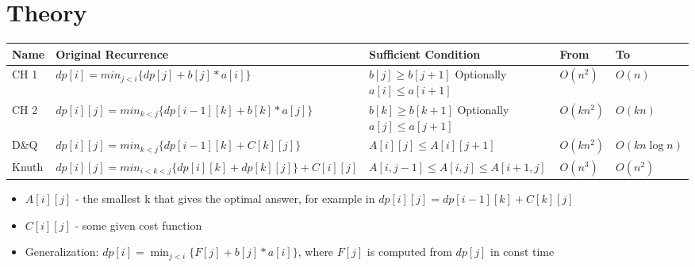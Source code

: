 \section{Theory}

{\renewcommand{\arraystretch}{2}
\begin{tabular}{|p{0.8cm}| p{4.5cm}| p{3.3cm}|p{0.9cm}| p{1.3cm}|}
	\hline
	Name & Original Recurrence & Sufficient Condition & From  & To  \\ 
	\hline
	CH 1 & $dp[i] = min_{j<i}\{dp[j]+b[j]*a[i ]\}$ & $b[j] \geq b[j+1]$ Optionally $a[i] \leq a[i+1]$ & $O(n^2)$ & $O(n)$ \\ 
	\hline
	CH 2 & $dp[i][j] = min_{k<j}\{dp[i-1][k] + b[k] * a[j]\}$ & $b[k] \geq b[k+1]$ Optionally $a[j] \leq a[j+1]$ & $O(kn^2)$ & $O(kn)$ \\ 
	\hline
	D\&Q & $dp[i][j] = min_{k<j}\{dp[i-1][k] + C[k][j]\}$ & $A[i][j] \leq A[i][j+1]$ & $O(kn^2)$ & $O(kn\log n)$ \\ 
	\hline
	Knuth & $dp[i][j] = min_{i<k<j} \{dp[i][k] + dp[k][j] \} + C[i][j] $ & $A[i, j -1] \leq A[i, j] \leq A[i+1, j]$ & $O(n^3)$ & $O(n^2)$ \\ 
	\hline
\end{tabular}}

\begin{itemize}
	\item $A[i][j]$ - the smallest k that gives the optimal answer, for example in $dp[i][j] = dp[i-1][k] + C[k][j]$
	\item $C[i][j]$ - some given cost function
	\item Generalization: $dp[i] = \min_{j<i}\{F[j]+b[j] * a[i]\}$, where $F[j]$ is computed from $dp[j]$ in const time
\end{itemize}


